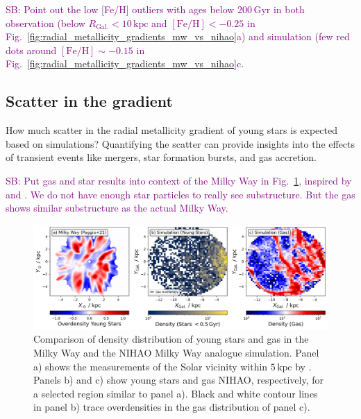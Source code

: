 \documentclass[fleqn,usenatbib]{mnras}
\newcommand{\SB}[1]{{\textcolor{purple}{SB: #1}}}
\begin{document}
\SB{Point out the low [Fe/H] outliers with ages below $200\,\mathrm{Gyr}$ in both observation (below $R_\mathrm{Gal.} < 10\,\mathrm{kpc}$ and $\mathrm{[Fe/H]} < -0.25$ in Fig.~\ref{fig:radial_metallicity_gradients_mw_vs_nihao}a) and simulation (few red dots around $\mathrm{[Fe/H]} \sim -0.15$ in Fig.~\ref{fig:radial_metallicity_gradients_mw_vs_nihao}c.}



\subsection{Scatter in the gradient} \label{sec:discussion_scatter}

How much scatter in the radial metallicity gradient of young stars is expected based on simulations? Quantifying the scatter can provide insights into the effects of transient events like mergers, star formation bursts, and gas accretion.

\SB{Put gas and star results into context of the Milky Way in Fig.~\ref{fig:overdensities_mw_vs_nihao}, inspired by \citet{Poggio2021} and \citet{Hackshaw2024}. We do not have enough star particles to really see substructure. But the gas shows similar substructure as the actual Milky Way.}

\begin{figure}
    \centering
    \includegraphics[width=\textwidth]{figures/overdensities_mw_vs_nihao.png}
    \caption{Comparison of density distribution of young stars and gas in the Milky Way and the NIHAO Milky Way analogue simulation. Panel a) shows the measurements of the Solar vicinity within $5\,\mathrm{kpc}$ by \citet{Poggio2021}. Panels b) and c) show young stars and gas NIHAO, respectively, for a selected region similar to panel a). Black and white contour lines in panel b) trace overdensities in the gas distribution of panel c).}
    \label{fig:overdensities_mw_vs_nihao}
\end{figure}
\end{document}
